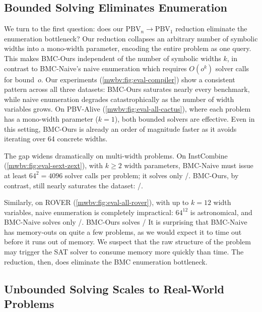 \subsection{Bounded Solving Eliminates Enumeration}
\label{mwbv:sec:bounded-eval}

We turn to the first question: does our $\text{PBV}_n \to \text{PBV}_1$ reduction eliminate the enumeration bottleneck?
Our reduction collapses an arbitrary number of symbolic widths
into a mono-width parameter, encoding the entire problem as one \qfbv{} query.
This makes BMC-Ours independent of the number of symbolic widths $k$,
in contrast to BMC-Naive's naive enumeration which requires $O(o^k)$ solver calls
for bound~$o$.
Our experiments (\cref{mwbv:fig:eval-compiler}) show a consistent pattern across all three datasets:
%
BMC-Ours saturates nearly every benchmark, while naive enumeration degrades
catastrophically as the number of width variables grows.
On PBV-Alive (\cref{mwbv:fig:eval-all-cactus}), where each problem has a mono-width parameter ($k=1$),
both bounded solvers are effective. Even in this setting, BMC-Ours is already an order of magnitude faster
as it avoids iterating over 64 concrete widths.

The gap widens dramatically on multi-width problems.
On InstCombine (\cref{mwbv:fig:eval-sext-zext}), with $k \geq 2$ width parameters,
BMC-Naive must issue at least $64^2 = 4096$ solver calls per problem;
it solves only \SextZextInstcombineNumSolvedNbmc{}/\SextZextInstcombineNumProblemsTotal{}.
BMC-Ours, by contrast, still nearly saturates the dataset:
\SextZextInstcombineNumSolvedMbmc{}/\SextZextInstcombineNumProblemsTotal{}.

Similarly, on ROVER (\cref{mwbv:fig:eval-all-rover}), with up to $k=12$ width variables,
naive enumeration is completely impractical: $64^{12}$ is astronomical, and
BMC-Naive solves only \RoverCactusNumSolvedNbmc{}/\RoverCactusNumProblemsTotal{}.
BMC-Ours solves \RoverCactusNumSolvedMbmc{}/\RoverCactusNumProblemsTotal{}
It is surprising that BMC-Naive has memory-outs on quite a few problems,
as we would expect it to time out before it runs out of memory.
We suspect that the raw structure of the problem may trigger the SAT solver to
consume memory more quickly than time.
%
%
The reduction, then, does eliminate the BMC enumeration bottleneck.

\subsection{Unbounded Solving Scales to Real-World Problems}
\label{mwbv:sec:unbounded-eval}

